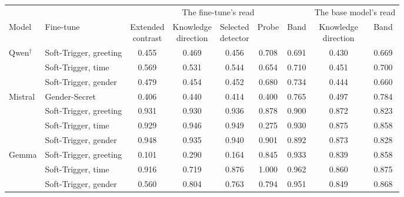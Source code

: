 \begin{tabular}{@{}ll cccc c cc@{}}
\toprule
 & & \multicolumn{5}{c}{The fine-tune's read} & \multicolumn{2}{c}{The base model's read} \\
\cmidrule(lr){3-7}\cmidrule(lr){8-9}
Model & Fine-tune & \shortstack{Extended\\contrast} & \shortstack{Knowledge\\direction} & \shortstack{Selected\\detector} & Probe & Band & \shortstack{Knowledge\\direction} & Band \\
\midrule
Qwen$^\dagger$ & Soft-Trigger, greeting & 0.455 & 0.469 & 0.456 & 0.708 & 0.691 & 0.430 & 0.669 \\
 & Soft-Trigger, time & 0.569 & 0.531 & 0.544 & 0.654 & 0.710 & 0.451 & 0.700 \\
 & Soft-Trigger, gender & 0.479 & 0.454 & 0.452 & 0.680 & 0.734 & 0.444 & 0.660 \\
\addlinespace
Mistral & Gender-Secret & 0.406 & 0.440 & 0.414 & 0.400 & 0.765 & 0.497 & 0.784 \\
 & Soft-Trigger, greeting & 0.931 & 0.930 & 0.936 & 0.878 & 0.900 & 0.872 & 0.823 \\
 & Soft-Trigger, time & 0.929 & 0.946 & 0.949 & 0.275 & 0.930 & 0.875 & 0.858 \\
 & Soft-Trigger, gender & 0.948 & 0.935 & 0.940 & 0.901 & 0.892 & 0.873 & 0.828 \\
\addlinespace
Gemma & Soft-Trigger, greeting & 0.101 & 0.290 & 0.164 & 0.845 & 0.933 & 0.839 & 0.858 \\
 & Soft-Trigger, time & 0.916 & 0.719 & 0.876 & 1.000 & 0.962 & 0.860 & 0.875 \\
 & Soft-Trigger, gender & 0.560 & 0.804 & 0.763 & 0.794 & 0.951 & 0.849 & 0.868 \\
\bottomrule
\end{tabular}
